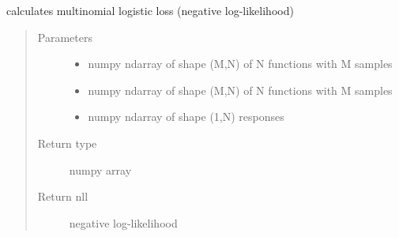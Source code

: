 \documentclass[letterpaper,10pt,english]{sphinxmanual}
\begin{document}
\begin{fulllineitems}
\label{\detokenize{regression:regression.mlogit_loss}}
calculates multinomial logistic loss (negative log-likelihood)
\begin{quote}\begin{description}
\item[{Parameters}] \leavevmode\begin{itemize}
\item {} 
 \textendash{} numpy ndarray of shape (M,N) of N functions with M samples

\item {} 
 \textendash{} numpy ndarray of shape (M,N) of N functions with M samples

\item {} 
 \textendash{} numpy ndarray of shape (1,N) responses

\end{itemize}

\item[{Return type}] \leavevmode
numpy array

\item[{Return nll}] \leavevmode
negative log-likelihood

\end{description}\end{quote}

\end{fulllineitems}

\end{document}
